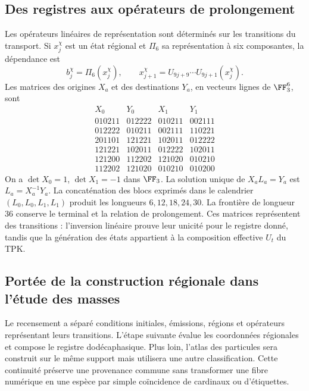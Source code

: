 \subsection{Des registres aux opérateurs de prolongement}

Les opérateurs linéaires de représentation sont déterminés sur les
transitions du transport. Si \(x_j^\chi\) est un état régional
et \(\Pi_6\) sa représentation à six composantes, la dépendance est
\[
 b_j^\chi=\Pi_6(x_j^\chi),\qquad
 x_{j+1}^\chi=U_{9j+9}\cdots U_{9j+1}(x_j^\chi).
\]
Les matrices des origines \(X_a\) et des destinations \(Y_a\), en
vecteurs lignes de \(\FF_3^6\), sont
\[
\begin{array}{c|c|c|c}
X_0&Y_0&X_1&Y_1\\\hline
010211&012222&010211&002111\\
012222&010211&002111&110221\\
201101&121221&102011&012222\\
121221&102011&012222&102011\\
121200&112202&121020&010210\\
112202&121020&010210&010200
\end{array}
\]
On a \(\det X_0=1\), \(\det X_1=-1\) dans \(\FF_3\).
La solution unique de \(X_aL_a=Y_a\) est \(L_a=X_a^{-1}Y_a\).
La concaténation des blocs exprimés dans le calendrier
\((L_0,L_0,L_1,L_1)\) produit les longueurs
\(6,12,18,24,30\). La frontière de longueur \(36\) conserve
le terminal et la relation de prolongement. Ces matrices
représentent des transitions : l’inversion linéaire prouve leur unicité
pour le registre donné, tandis que la génération des états
appartient à la composition effective \(U_t\) du TPK.

\subsection{Portée de la construction régionale dans l’étude des masses}

Le recensement a séparé conditions initiales, émissions, régions et
opérateurs représentant leurs transitions. L’étape suivante
évalue les coordonnées régionales et compose le registre dodécaphasique.
Plus loin, l’atlas des particules sera construit sur le même
support mais utilisera une autre classification. Cette continuité préserve
une provenance commune sans transformer une fibre numérique en une
espèce par simple coïncidence de cardinaux ou d’étiquettes.
